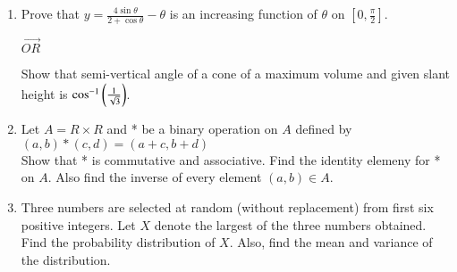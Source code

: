 \documentclass[journal,12pt,twocolumn]{IEEEtran}
\theoremstyle{remark}
\begin{document}
\begin{enumerate}
\item Prove that $y = \frac{4\sin\theta}{2+\cos\theta} - \theta$ is an increasing function of $\theta$ on $\left [0, \frac{\pi}{2}\right ]$.
\begin{center} $\vec{OR}$ \\ \end{center}
Show that semi-vertical angle of a cone of a maximum volume and given slant height is $\cos^{-1}\left(\frac{1}{\sqrt{3}}\right)$.

\item Let $A=R\times R$ and * be a binary operation on $A$ defined by $(a,b)*(c,d) = (a+c,b+d)$\\
Show that * is commutative and associative. Find the identity elemeny for * on $A$. Also find the inverse of every element $(a, b) \in A$.\\

\item Three numbers are selected at random (without replacement) from first six positive integers. Let $X$ denote the largest of the three numbers obtained. Find the probability distribution of $X$. Also, find the mean and variance of the distribution.

\end{enumerate}
\end{document}
